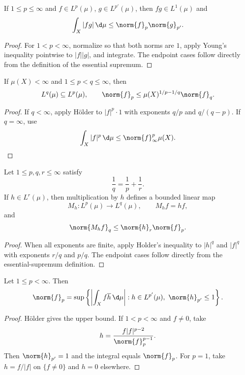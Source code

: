 \begin{thm}
If $1\leq p\leq\infty$ and $f\in L^p(\mu)$, $g\in L^{p'}(\mu)$, then $fg\in L^1(\mu)$ and
\[
\int_X|fg|\,\d\mu\leq\norm{f}_p\norm{g}_{p'}.
\]
\end{thm}

\begin{proof}
For $1<p<\infty$, normalize so that both norms are $1$, apply Young's inequality pointwise to $|f||g|$, and integrate. The endpoint cases follow directly from the definition of the essential supremum.
\end{proof}

\begin{cor}
If $\mu(X)<\infty$ and $1\leq p<q\leq\infty$, then
\[
L^q(\mu)\subseteq L^p(\mu),
\qquad
\norm{f}_p\leq\mu(X)^{1/p-1/q}\norm{f}_q.
\]
\end{cor}

\begin{proof}
If $q<\infty$, apply Hölder to $|f|^p\cdot1$ with exponents $q/p$ and $q/(q-p)$. If $q=\infty$, use
\[
\int_X|f|^p\,\d\mu\leq\norm{f}_\infty^p\mu(X).
\]
\end{proof}

\begin{prop}
Let $1\leq p,q,r\leq\infty$ satisfy
\[
\frac1q=\frac1p+\frac1r.
\]
If $h\in L^r(\mu)$, then multiplication by $h$ defines a bounded linear map
\[
M_h:L^p(\mu)\longrightarrow L^q(\mu),
\qquad M_hf=hf,
\]
and
\[
\norm{M_hf}_q\leq\norm{h}_r\norm{f}_p.
\]
\end{prop}

\begin{proof}
When all exponents are finite, apply Holder's inequality to $|h|^q$ and $|f|^q$ with exponents $r/q$ and $p/q$. The endpoint cases follow directly from the essential-supremum definition.
\end{proof}

\begin{thm}
Let $1\leq p<\infty$. Then
\[
\norm{f}_p
=\sup\left\{\left|\int_X f\overline h\,\d\mu\right|:
 h\in L^{p'}(\mu),\ \norm{h}_{p'}\leq1\right\}.
\]
\end{thm}

\begin{proof}
Hölder gives the upper bound. If $1<p<\infty$ and $f\neq0$, take
\[
h=\frac{f|f|^{p-2}}{\norm{f}_p^{p-1}}.
\]
Then $\norm{h}_{p'}=1$ and the integral equals $\norm{f}_p$. For $p=1$, take $h=f/|f|$ on $\{f\neq0\}$ and $h=0$ elsewhere.
\end{proof}


